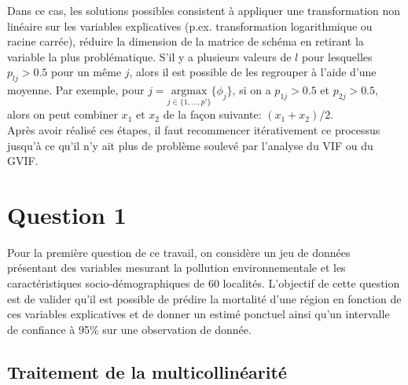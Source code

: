 \documentclass{article}
\begin{document}
Dans ce cas, les solutions possibles consistent à appliquer une transformation non linéaire sur les variables explicatives (p.ex. transformation logarithmique ou racine carrée), réduire la dimension de la matrice de schéma en retirant la variable la plus problématique. S'il y a plusieurs valeurs de $l$ pour lesquelles $p_{lj}>0.5$ pour un même $j$, alors il est possible de les regrouper à l'aide d'une moyenne. Par exemple, pour $j=\underset{j\in\{1,\dots,p'\}}{\mathrm{argmax}}\{\phi_j\}$, si on a $p_{1j}>0.5$ et $p_{2j}>0.5$, alors on peut combiner $x_1$ et $x_2$ de la façon suivante: $(x_1+x_2)/2$.\\

Après avoir réalisé ces étapes, il faut recommencer itérativement ce processus jusqu'à ce qu'il n'y ait plus de problème soulevé par l'analyse du VIF ou du GVIF.


\section{Question 1}\label{sect_qst1}

	Pour la première question de ce travail, on considère un jeu de données présentant des variables mesurant la pollution environnementale et les caractéristiques socio-démographiques de 60 localités. L'objectif de cette question est de valider qu'il est possible de prédire la mortalité d'une région en fonction de ces variables explicatives et de donner un estimé ponctuel ainsi qu’un intervalle de confiance à 95\% sur une observation de donnée.
	
	\subsection{Traitement de la multicollinéarité}
	
\end{document}
